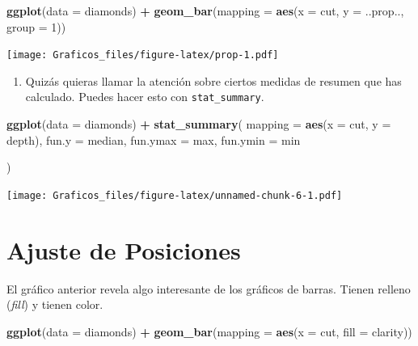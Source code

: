 \documentclass[]{book}
\newenvironment{Shaded}{\begin{snugshade}}{\end{snugshade}}
\newcommand{\DataTypeTok}[1]{\textcolor[rgb]{0.13,0.29,0.53}{#1}}
\newcommand{\DecValTok}[1]{\textcolor[rgb]{0.00,0.00,0.81}{#1}}
\newcommand{\KeywordTok}[1]{\textcolor[rgb]{0.13,0.29,0.53}{\textbf{#1}}}
\newcommand{\NormalTok}[1]{#1}
\newcommand{\OperatorTok}[1]{\textcolor[rgb]{0.81,0.36,0.00}{\textbf{#1}}}
\newcommand{\StringTok}[1]{\textcolor[rgb]{0.31,0.60,0.02}{#1}}
\providecommand{\tightlist}{%
  \setlength{\itemsep}{0pt}\setlength{\parskip}{0pt}}
\theoremstyle{definition}
\theoremstyle{definition}
\theoremstyle{definition}
\theoremstyle{remark}
\begin{document}
\begin{Shaded}
\begin{Highlighting}[]
\KeywordTok{ggplot}\NormalTok{(}\DataTypeTok{data =}\NormalTok{ diamonds) }\OperatorTok{+}
\StringTok{  }\KeywordTok{geom_bar}\NormalTok{(}\DataTypeTok{mapping =} \KeywordTok{aes}\NormalTok{(}\DataTypeTok{x =}\NormalTok{ cut, }\DataTypeTok{y =}\NormalTok{ ..prop.., }\DataTypeTok{group =} \DecValTok{1}\NormalTok{))}
\end{Highlighting}
\end{Shaded}

\texttt{[image: Graficos\_files/figure-latex/prop-1.pdf]}

\begin{enumerate}
\def\labelenumi{\arabic{enumi}.}
\setcounter{enumi}{2}
\tightlist
\item
  Quizás quieras llamar la atención sobre ciertos medidas de resumen que
  has calculado. Puedes hacer esto con \texttt{stat\_summary}.
\end{enumerate}

\begin{Shaded}
\begin{Highlighting}[]
\KeywordTok{ggplot}\NormalTok{(}\DataTypeTok{data =}\NormalTok{ diamonds) }\OperatorTok{+}
\StringTok{  }\KeywordTok{stat_summary}\NormalTok{(}
    \DataTypeTok{mapping =} \KeywordTok{aes}\NormalTok{(}\DataTypeTok{x =}\NormalTok{ cut, }\DataTypeTok{y =}\NormalTok{ depth),}
    \DataTypeTok{fun.y =}\NormalTok{ median,}
    \DataTypeTok{fun.ymax =}\NormalTok{ max,}
    \DataTypeTok{fun.ymin =}\NormalTok{ min}
    
\NormalTok{  )}
\end{Highlighting}
\end{Shaded}

\texttt{[image: Graficos\_files/figure-latex/unnamed-chunk-6-1.pdf]}

\hypertarget{ajuste-de-posiciones}{%
\section{Ajuste de Posiciones}\label{ajuste-de-posiciones}}

El gráfico anterior revela algo interesante de los gráficos de barras.
Tienen relleno (\emph{fill}) y tienen color.

\begin{Shaded}
\begin{Highlighting}[]
\KeywordTok{ggplot}\NormalTok{(}\DataTypeTok{data =}\NormalTok{ diamonds) }\OperatorTok{+}\StringTok{ }
\StringTok{  }\KeywordTok{geom_bar}\NormalTok{(}\DataTypeTok{mapping =} \KeywordTok{aes}\NormalTok{(}\DataTypeTok{x =}\NormalTok{ cut, }\DataTypeTok{fill =}\NormalTok{ clarity))}
\end{Highlighting}
\end{Shaded}
\end{document}
